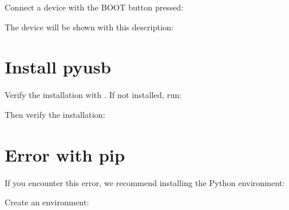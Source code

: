 \documentclass[letterpaper,10pt,english]{sphinxmanual}
\begin{document}
\sphinxAtStartPar
Connect a device with the BOOT button pressed:

\begin{sphinxVerbatim}[commandchars=\\\{\}]
\end{sphinxVerbatim}

\sphinxAtStartPar
The device will be shown with this description:

\begin{sphinxVerbatim}[commandchars=\\\{\}]
\end{sphinxVerbatim}


\section{Install pyusb}
\label{\detokenize{install_linux:install-pyusb}}
\sphinxAtStartPar
Verify the installation with . If not installed, run:

\begin{sphinxVerbatim}[commandchars=\\\{\}]
   
\end{sphinxVerbatim}

\sphinxAtStartPar
Then verify the installation:

\begin{sphinxVerbatim}[commandchars=\\\{\}]
    
\end{sphinxVerbatim}


\section{Error with pip}
\label{\detokenize{install_linux:error-with-pip}}
\sphinxAtStartPar
If you encounter this error, we recommend installing the Python environment:

\begin{sphinxVerbatim}[commandchars=\\\{\}]
   
\end{sphinxVerbatim}

\sphinxAtStartPar
Create an environment:

\begin{sphinxVerbatim}[commandchars=\\\{\}]
   
\end{sphinxVerbatim}
\end{document}
